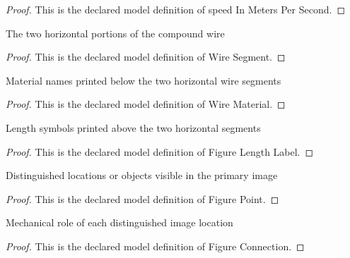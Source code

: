 \begin{proof}
  This is the declared model definition of speed In Meters Per Second.
\end{proof}
\begin{definition}
  \label{def:physics:phyx-mini-0299:phyxminiproblems-problemphyxmini0299-wiresegment}
  The two horizontal portions of the compound wire
\end{definition}
\begin{proof}
  This is the declared model definition of Wire Segment.
\end{proof}
\begin{definition}
  \label{def:physics:phyx-mini-0299:phyxminiproblems-problemphyxmini0299-wirematerial}
  Material names printed below the two horizontal wire segments
\end{definition}
\begin{proof}
  This is the declared model definition of Wire Material.
\end{proof}
\begin{definition}
  \label{def:physics:phyx-mini-0299:phyxminiproblems-problemphyxmini0299-figurelengthlabel}
  Length symbols printed above the two horizontal segments
\end{definition}
\begin{proof}
  This is the declared model definition of Figure Length Label.
\end{proof}
\begin{definition}
  \label{def:physics:phyx-mini-0299:phyxminiproblems-problemphyxmini0299-figurepoint}
  Distinguished locations or objects visible in the primary image
\end{definition}
\begin{proof}
  This is the declared model definition of Figure Point.
\end{proof}
\begin{definition}
  \label{def:physics:phyx-mini-0299:phyxminiproblems-problemphyxmini0299-figureconnection}
  Mechanical role of each distinguished image location
\end{definition}
\begin{proof}
  This is the declared model definition of Figure Connection.
\end{proof}

